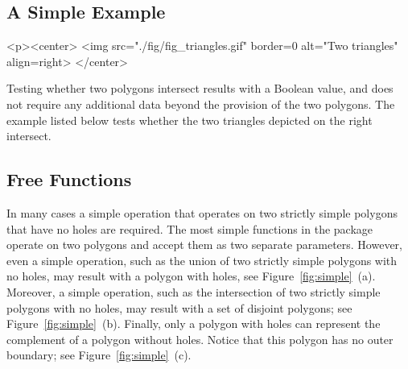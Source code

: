 \subsection{A Simple Example}
\label{bso_ssec:simple_example}
\lcTex{%
  \setlength{\widthRight}{2cm}
  \setlength{\widthLeft}{\widthLineReal}
  \addtolength{\widthLeft}{-\widthRight}
  \begin{minipage}{\widthLeft}
}
\label{fig:example}
\begin{ccHtmlOnly}
  <p><center>
    <img src="./fig/fig_triangles.gif" border=0 alt="Two triangles" align=right>
  </center>
\end{ccHtmlOnly}
Testing whether two polygons intersect results with a Boolean value, 
and does not require any additional data beyond the provision of the 
two polygons. The example listed below tests whether the two triangles 
depicted on the right intersect.


\subsection{Free Functions}
\label{bso_ssec:free_functions}
In many cases a simple operation that operates on two strictly simple
polygons that have no holes are required. The most simple functions in
the package operate on two polygons and accept them as two separate
parameters. However, even a simple operation, such as the union of two
strictly simple polygons with no holes, may result with a polygon with
holes, see Figure~\ref{fig:simple}~(a). Moreover, a simple operation,
such as the intersection of two strictly simple polygons with no holes, 
may result with a set of disjoint polygons; see
Figure~\ref{fig:simple}~(b). Finally, only a polygon with holes can
represent the complement of a polygon without holes. Notice that this
polygon has no outer boundary; see Figure~\ref{fig:simple}~(c).

